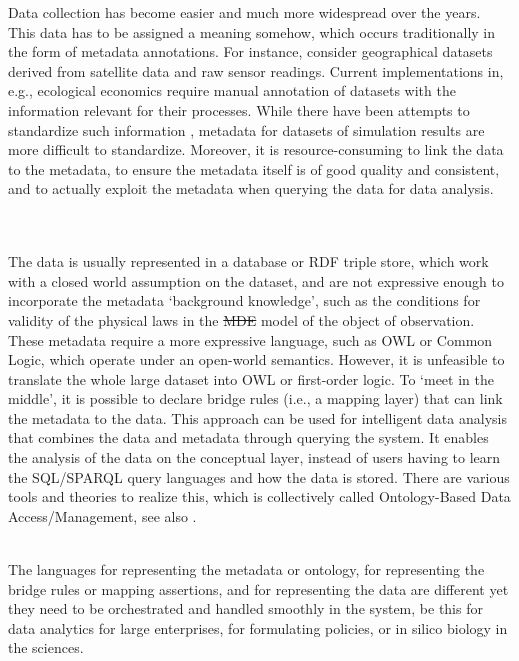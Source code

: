 \documentclass[10pt, a4paper]{isov2}
\newcommand{\bc}[1]{~\\{\color{violet}\large \hrulefill \href{http://issues.omg.org/browse/DOL-#1}{\normalfont{JIRA DOL-{}#1}} \hrulefill\\}  }
\newcommand{\ec}[0]{~\\{{\color{violet}\large \hrulefill {\normalfont{end}} \hrulefill\\}  }}
\newcommand*{\termref}[1]{\index{#1}#1\xspace}
\providecommand{\DIFdeltex}[1]{{\protect\color{red}\sout{#1}}}                      %
\providecommand{\DIFdelbegin}{} %
\providecommand{\DIFdelend}{} %
\providecommand{\DIFdel}[1]{\texorpdfstring{\DIFdeltex{#1}}{}} %
\begin{document}

Data collection has become easier and much more widespread over the years. This data has to be 
assigned a meaning somehow, which occurs traditionally in the  form of metadata annotations. For 
instance, consider geographical datasets derived from satellite data and raw sensor readings. 
Current implementations in, e.g., ecological economics \cite{bagstad_aries_2011} require manual 
annotation of datasets with the information relevant for their processes. While there have been 
attempts to standardize such information \cite{european_comission_inspire_2014}, metadata for 
datasets of simulation results are more difficult to standardize. Moreover, it is 
resource-consuming to link the data to the metadata, to ensure the metadata itself is of good 
quality and consistent, and to actually exploit the metadata when querying the data for data 
analysis. 

\bc{82}
The data is usually represented in a database or RDF triple store, which work with a \termref{closed world assumption} on the dataset, and are not expressive enough to 
incorporate the metadata `background knowledge', such as the conditions for validity of the physical laws in the \DIFdelbegin \DIFdel{MDE }\DIFdelend model of the object of observation. These metadata 
require a more expressive language, such as OWL or Common Logic, which operate under an open-world semantics. However, it is unfeasible to translate the 
whole large dataset into OWL or first-order logic. To `meet in the middle', it is possible to declare bridge rules (i.e., a mapping layer) that can link the metadata to 
the data. This approach can be used for intelligent data analysis that combines the data and metadata through querying the system. It enables the analysis of the 
data on the conceptual layer, instead of users having to learn the SQL/SPARQL query languages and how the data is stored. There are various tools and theories 
to realize this, which is collectively called Ontology-Based Data Access/Management, see also \cite{CalvaneseEtAl11}.
\ec

The languages for representing the metadata or ontology, for representing the bridge rules or mapping assertions, and for representing the data are different yet 
they need to be orchestrated and handled smoothly in the system, be this for data analytics for large enterprises, for formulating policies, or in silico biology in the 
sciences. 
\end{document}
